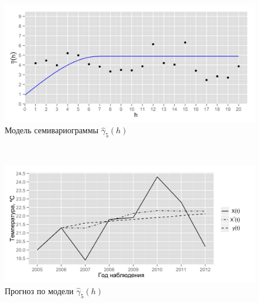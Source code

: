 \documentclass{beamer}
\begin{document}
\begin{frame}
\begin{multicols}{2}
    \columnbreak
    \begin{figure}[H]
      \begin{center}
        \begin{minipage}[H]{0.95\linewidth}
          \begin{center}
            \includegraphics[width=1\linewidth]{../../figures/variogram/sph-fit-adapt-modeled.png} \\ Модель семивариограммы $\widehat{\gamma}_5(h)$
          \end{center}
        \end{minipage}
        \\
        \begin{minipage}[H]{0.95\linewidth}
          \begin{center}
            \includegraphics[width=1\linewidth]{../../figures/variogram/sph-fit-adapt-cross-prediction.png} \\ Прогноз по модели $\widehat{\gamma}_5(h)$
          \end{center}
        \end{minipage}
      \end{center}
    \end{figure}
  \end{multicols}
\end{frame}
\end{document}
